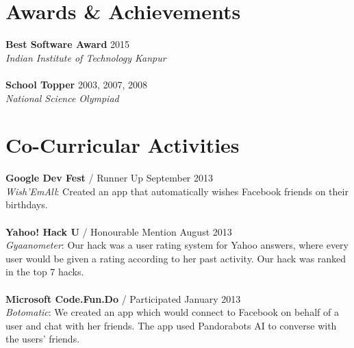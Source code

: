 \documentclass[margin,line]{res}
\begin{document}
\begin{resume}
\begin{comment}
{\bf DoS/DDoS Mitigation System for Web Applications} \\
{\em For partial fulfillment of a Software Architecture course} \\
Project involved architecting and implementing a solution to mitigate DoS/DDoS attacks up to the transport layer. The solution involved rate limiting and limiting the number of concurrent connections using Firewall and Reverse Proxy. Improved the architecture with respect to  availability of the system by usage of application server clusters and a load balancer.

{\bf Digital Image Compression using Haar Wavelet Transform} \\
{\em BTech Project} \\
Project involved compressing images by first encoding them using the Haar wavelet transform, followed by compressing them. A file format for storing the encoded images was developed. 

\end{comment}

\section{\sc Awards \& Achievements}

{\bf Best Software Award} {\hfill} 2015 \\
{\em Indian Institute of Technology Kanpur} \\
\\
{\bf School Topper} {\hfill} 2003, 2007, 2008 \\
{\em National Science Olympiad} \\

\section{\sc Co-Curricular Activities}

{\bf Google Dev Fest} / Runner Up {\hfill} September 2013 \\
{\em Wish’EmAll}: Created an app that automatically wishes Facebook friends on their birthdays. \\
\\
{\bf Yahoo! Hack U} / Honourable Mention {\hfill} August 2013 \\
{\em Gyaanometer}: Our hack was a user rating system for Yahoo answers, where every user would be given a rating according to her past activity. Our hack was ranked in the top 7 hacks. \\
\\
{\bf Microsoft Code.Fun.Do} / Participated {\hfill} January 2013 \\
{\em Botomatic}: We created an app which would connect to Facebook on behalf of a user and chat with her friends. The app used Pandorabots AI to converse with the users' friends.

\end{resume}
\end{document}
